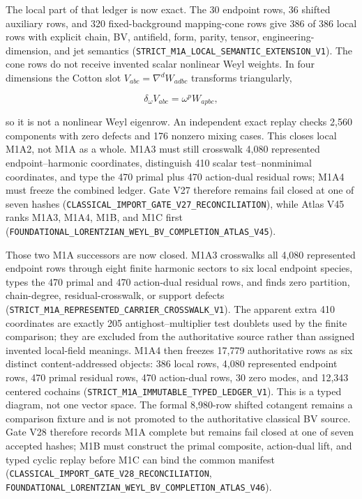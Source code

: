 \documentclass[11pt]{article}
\theoremstyle{definition}
\theoremstyle{remark}
\newcommand{\cert}[1]{\nolinkurl{#1}}
\begin{document}
The local part of that ledger is now exact.  The 30 endpoint rows, 36 shifted
auxiliary rows, and 320 fixed-background mapping-cone rows give 386 of 386
local rows with explicit chain, BV, antifield, form, parity, tensor,
engineering-dimension, and jet semantics
(\cert{STRICT_M1A_LOCAL_SEMANTIC_EXTENSION_V1}).  The cone rows do not receive
invented scalar nonlinear Weyl weights.  In four dimensions the Cotton slot
\(V_{abc}=\nabla^dW_{adbc}\) transforms triangularly,

\[
  \delta_\omega V_{abc}=\omega^p W_{apbc},
\]

so it is not a nonlinear Weyl eigenrow.  An independent exact replay checks
2,560 components with zero defects and 176 nonzero mixing cases.  This closes
local M1A2, not M1A as a whole.  M1A3 must still crosswalk 4,080 represented
endpoint--harmonic coordinates, distinguish 410 scalar test--nonminimal
coordinates, and type the 470 primal plus 470 action-dual residual rows; M1A4
must freeze the combined ledger.  Gate V27 therefore remains fail closed at
one of seven hashes (\cert{CLASSICAL_IMPORT_GATE_V27_RECONCILIATION}), while
Atlas V45 ranks M1A3, M1A4, M1B, and M1C first
(\cert{FOUNDATIONAL_LORENTZIAN_WEYL_BV_COMPLETION_ATLAS_V45}).

Those two M1A successors are now closed.  M1A3 crosswalks all 4,080
represented endpoint rows through eight finite harmonic sectors to six local
endpoint species, types the 470 primal and 470 action-dual residual rows, and
finds zero partition, chain-degree, residual-crosswalk, or support defects
(\cert{STRICT_M1A_REPRESENTED_CARRIER_CROSSWALK_V1}).  The apparent extra 410
coordinates are exactly 205 antighost--multiplier test doublets used by the
finite comparison; they are excluded from the authoritative source rather
than assigned invented local-field meanings.  M1A4 then freezes 17,779
authoritative rows as six distinct content-addressed objects: 386 local rows,
4,080 represented endpoint rows, 470 primal residual rows, 470 action-dual
rows, 30 zero modes, and 12,343 centered cochains
(\cert{STRICT_M1A_IMMUTABLE_TYPED_LEDGER_V1}).  This is a typed diagram, not
one vector space.  The formal 8,980-row shifted cotangent remains a comparison
fixture and is not promoted to the authoritative classical BV source.  Gate
V28 therefore records M1A complete but remains fail closed at one of seven
accepted hashes; M1B must construct the primal composite, action-dual lift,
and typed cyclic replay before M1C can bind the common manifest
(\cert{CLASSICAL_IMPORT_GATE_V28_RECONCILIATION},
\cert{FOUNDATIONAL_LORENTZIAN_WEYL_BV_COMPLETION_ATLAS_V46}).
\end{document}
